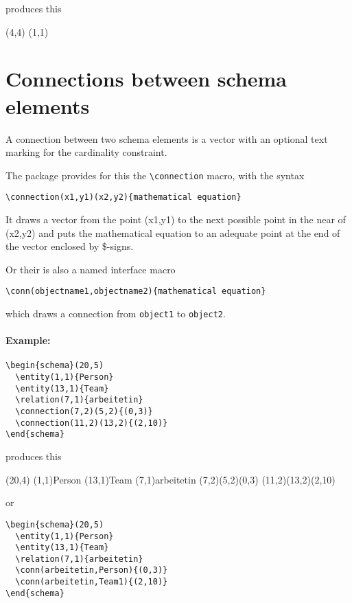 \documentclass[a4paper,11pt]{article}
\begin{document}
produces this

\begin{schema}(4,4)
\cluster(1,1)
\end{schema}

\section{Connections between schema elements}

A connection between two schema elements is a vector with an optional
text marking for the cardinality constraint.

The package provides for this the \verb|\connection| macro, with the syntax

\begin{verbatim}
\connection(x1,y1)(x2,y2){mathematical equation}
\end{verbatim}

It draws a vector from the point (x1,y1) to the next possible point in the near
of (x2,y2) and puts the mathematical equation to an adequate point at the end of the 
vector enclosed by \$-signs. 

Or their is also a named interface macro 

\begin{verbatim}
\conn(objectname1,objectname2){mathematical equation}
\end{verbatim}

which draws a connection from {\tt object1} to {\tt object2}.

\paragraph{Example:}

\begin{verbatim}
\begin{schema}(20,5)
  \entity(1,1){Person}
  \entity(13,1){Team}
  \relation(7,1){arbeitetin}
  \connection(7,2)(5,2){(0,3)}
  \connection(11,2)(13,2){(2,10)}
\end{schema}
\end{verbatim}

produces this

\begin{schema}(20,4)
  \entity(1,1){Person}
  \entity(13,1){Team}
  \relation(7,1){arbeitetin}
  \connection(7,2)(5,2){(0,3)}
  \connection(11,2)(13,2){(2,10)}
\end{schema}

or

\begin{verbatim}
\begin{schema}(20,5)
  \entity(1,1){Person}
  \entity(13,1){Team}
  \relation(7,1){arbeitetin}
  \conn(arbeitetin,Person){(0,3)}
  \conn(arbeitetin,Team1){(2,10)}
\end{schema}
\end{verbatim}
\end{document}
